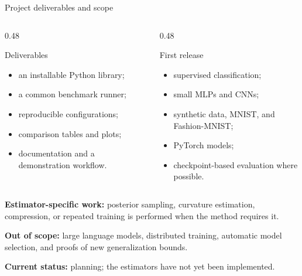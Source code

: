 \documentclass[aspectratio=169,notheorems]{beamer}
\begin{document}
\begin{frame}{Project deliverables and scope}
\small
\begin{columns}[T]
\begin{column}{0.48\textwidth}
\begin{block}{Deliverables}
\begin{itemize}\setlength{\itemsep}{0.3em}
  \item an installable Python library;
  \item a common benchmark runner;
  \item reproducible configurations;
  \item comparison tables and plots;
  \item documentation and a demonstration workflow.
\end{itemize}
\end{block}
\end{column}
\begin{column}{0.48\textwidth}
\begin{block}{First release}
\begin{itemize}\setlength{\itemsep}{0.3em}
  \item supervised classification;
  \item small MLPs and CNNs;
  \item synthetic data, MNIST, and Fashion-MNIST;
  \item PyTorch models;
  \item checkpoint-based evaluation where possible.
\end{itemize}
\end{block}
\end{column}
\end{columns}

\medskip
\textbf{Estimator-specific work:} posterior sampling, curvature estimation, compression,
or repeated training is performed when the method requires it.

\textbf{Out of scope:} large language models, distributed training, automatic model
selection, and proofs of new generalization bounds.

\textbf{Current status:} planning; the estimators have not yet been implemented.
\end{frame}
\end{document}
